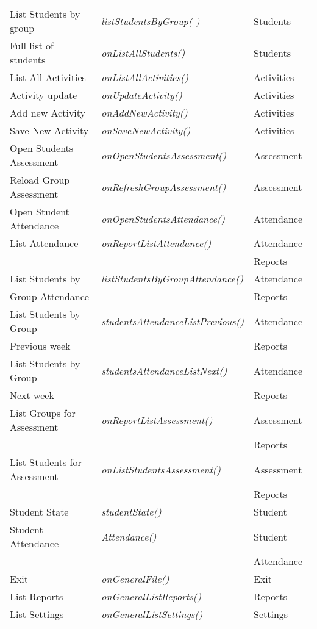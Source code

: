 \begin{bclogo}[couleur=orange!30,logo=\bcbook, arrondi=0.1,ombre=true ]
\begin{tabular}{lll}
List Students by group          &  \emph{ listStudentsByGroup( )}   & Students \\
Full list of students           &  \emph{ onListAllStudents()  }    & Students \\
List All Activities             &  \emph{ onListAllActivities()}   &   Activities \\
Activity update                 &  \emph{ onUpdateActivity()  }   &   Activities \\
Add new Activity                &  \emph{ onAddNewActivity()  }   &   Activities \\
Save New Activity               &  \emph{ onSaveNewActivity() }    &   Activities \\
Open Students Assessment        &  \emph{ onOpenStudentsAssessment()} & Assessment \\
Reload Group Assessment         &  \emph{ onRefreshGroupAssessment()} & Assessment \\
Open Student Attendance         &  \emph{onOpenStudentsAttendance() }& Attendance \\
List Attendance                 &  \emph{onReportListAttendance() }  & Attendance\ \\
                         &                                   & Reports \\
List Students by             & \emph{listStudentsByGroupAttendance() } & Attendance \\
 Group Attendance           &   & Reports \\
List Students by Group     & \emph{studentsAttendanceListPrevious()} & Attendance\\
Previous week                   &                           & Reports \\

List Students by Group    & \emph{ studentsAttendanceListNext()} & Attendance  \\
Next week   &  & Reports\\

List Groups for Assessment      &  \emph{ onReportListAssessment() } & Assessment  \\
                         &                                   & Reports \\
List Students for Assessment    &  \emph{onListStudentsAssessment()} & Assessment  \\
                         &                                   & Reports \\
Student State       &    \emph{ studentState() }    & Student \\
Student Attendance &   \emph{ Attendance()}    & Student  \\
                 &                  &  Attendance \\
Exit            & \emph{ onGeneralFile()} & Exit  \\
List Reports    & \emph{ onGeneralListReports()}    & Reports \\
List Settings   &  \emph{ onGeneralListSettings()}  & Settings \\


\end{tabular}
\end{bclogo}
